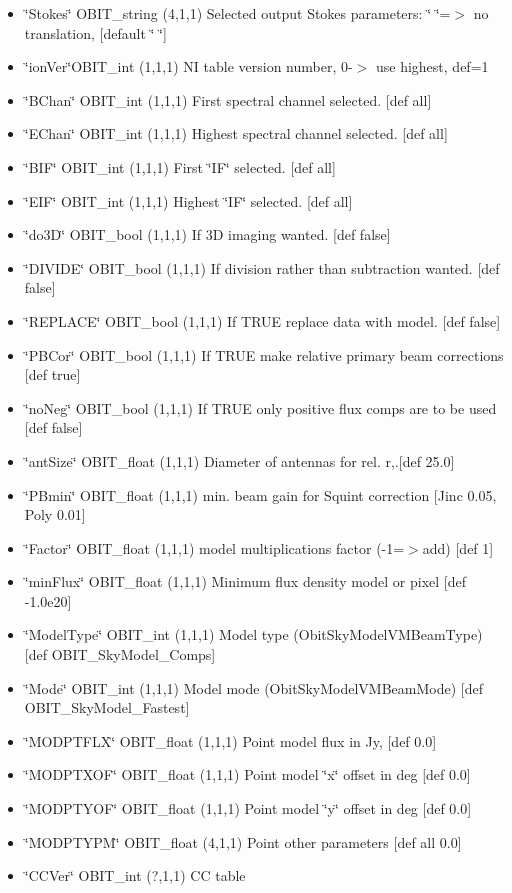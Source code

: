 \begin{itemize}
\item \char`\"{}Stokes\char`\"{} OBIT\_\-string (4,1,1) Selected output Stokes parameters: \char`\"{}    \char`\"{}=$>$ no translation, [default \char`\"{}    \char`\"{}] \item \char`\"{}ion\-Ver\char`\"{}OBIT\_\-int (1,1,1) NI table version number, 0-$>$ use highest, def=1 \item \char`\"{}BChan\char`\"{} OBIT\_\-int (1,1,1) First spectral channel selected. [def all] \item \char`\"{}EChan\char`\"{} OBIT\_\-int (1,1,1) Highest spectral channel selected. [def all] \item \char`\"{}BIF\char`\"{} OBIT\_\-int (1,1,1) First \char`\"{}IF\char`\"{} selected. [def all] \item \char`\"{}EIF\char`\"{} OBIT\_\-int (1,1,1) Highest \char`\"{}IF\char`\"{} selected. [def all] \item \char`\"{}do3D\char`\"{} OBIT\_\-bool (1,1,1) If 3D imaging wanted. [def false] \item \char`\"{}DIVIDE\char`\"{} OBIT\_\-bool (1,1,1) If division rather than subtraction wanted. [def false] \item \char`\"{}REPLACE\char`\"{} OBIT\_\-bool (1,1,1) If TRUE replace data with model. [def false] \item \char`\"{}PBCor\char`\"{} OBIT\_\-bool (1,1,1) If TRUE make relative primary beam corrections [def true] \item \char`\"{}no\-Neg\char`\"{} OBIT\_\-bool (1,1,1) If TRUE only positive flux comps are to be used [def false] \item \char`\"{}ant\-Size\char`\"{} OBIT\_\-float (1,1,1) Diameter of antennas for rel. r,.[def 25.0] \item \char`\"{}PBmin\char`\"{} OBIT\_\-float (1,1,1) min. beam gain for Squint correction [Jinc 0.05, Poly 0.01] \item \char`\"{}Factor\char`\"{} OBIT\_\-float (1,1,1) model multiplications factor (-1=$>$add) [def 1] \item \char`\"{}min\-Flux\char`\"{} OBIT\_\-float (1,1,1) Minimum flux density model or pixel [def -1.0e20] \item \char`\"{}Model\-Type\char`\"{} OBIT\_\-int (1,1,1) Model type (Obit\-Sky\-Model\-VMBeam\-Type) [def OBIT\_\-Sky\-Model\_\-Comps] \item \char`\"{}Mode\char`\"{} OBIT\_\-int (1,1,1) Model mode (Obit\-Sky\-Model\-VMBeam\-Mode) [def OBIT\_\-Sky\-Model\_\-Fastest] \item \char`\"{}MODPTFLX\char`\"{} OBIT\_\-float (1,1,1) Point model flux in Jy, [def 0.0] \item \char`\"{}MODPTXOF\char`\"{} OBIT\_\-float (1,1,1) Point model \char`\"{}x\char`\"{} offset in deg [def 0.0] \item \char`\"{}MODPTYOF\char`\"{} OBIT\_\-float (1,1,1) Point model \char`\"{}y\char`\"{} offset in deg [def 0.0] \item \char`\"{}MODPTYPM\char`\"{} OBIT\_\-float (4,1,1) Point other parameters [def all 0.0] \item \char`\"{}CCVer\char`\"{} OBIT\_\-int (?,1,1) CC table 
\end{itemize}
